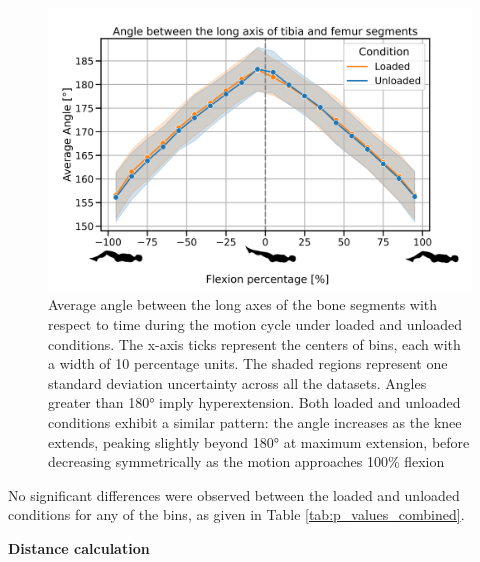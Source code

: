 \documentclass{micro-econ-thesis}
\begin{document}
\begin{figure}[H]
	\centering
	\includegraphics[width=0.7\linewidth]{angle_no_13_stick}
	\caption{Average angle between the long axes of the bone segments with respect to time during the motion cycle under loaded and unloaded conditions. The x-axis ticks represent the centers of bins, each with a width of 10 percentage units. The shaded regions represent one standard deviation uncertainty across all the datasets. Angles greater than 180° imply hyperextension. Both loaded and unloaded conditions exhibit a similar pattern: the angle increases as the knee extends, peaking slightly beyond 180° at maximum extension, before decreasing symmetrically as the motion approaches 100\% flexion}
	\label{fig:anglegraphstickman}
\end{figure}

No significant differences were observed between the loaded and unloaded conditions for any of the bins, as given in Table \ref{tab:p_values_combined}. 

\textbf{Distance calculation }
\end{document}
